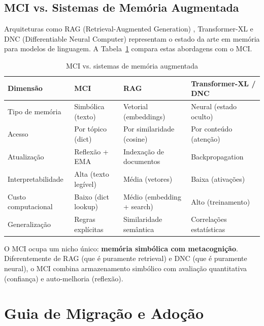 \subsection{MCI vs. Sistemas de Memória Augmentada}

Arquiteturas como RAG (Retrieval-Augmented Generation) \cite{Lewis2020_RAG}, Transformer-XL \cite{Dai2019_TransformerXL} e DNC (Differentiable Neural Computer) \cite{Rae2016_DNC} representam o estado da arte em memória para modelos de linguagem. A Tabela~\ref{tab:augmented-memory} compara estas abordagens com o MCI.

\begin{table}[htbp]
\centering
\caption{MCI vs. sistemas de memória augmentada}
\label{tab:augmented-memory}
\begin{tabular}{@{}p{2.5cm}p{3.5cm}p{3.5cm}p{3.5cm}@{}}
\toprule
\textbf{Dimensão} & \textbf{MCI} & \textbf{RAG} & \textbf{Transformer-XL / DNC} \\
\midrule
Tipo de memória & Simbólica (texto) & Vetorial (embeddings) & Neural (estado oculto) \\
Acesso & Por tópico (dict) & Por similaridade (cosine) & Por conteúdo (atenção) \\
Atualização & Reflexão + EMA & Indexação de documentos & Backpropagation \\
Interpretabilidade & Alta (texto legível) & Média (vetores) & Baixa (ativações) \\
Custo computacional & Baixo (dict lookup) & Médio (embedding + search) & Alto (treinamento) \\
Generalização & Regras explícitas & Similaridade semântica & Correlações estatísticas \\
\bottomrule
\end{tabular}
\end{table}

O MCI ocupa um nicho único: \textbf{memória simbólica com metacognição}. Diferentemente de RAG (que é puramente retrieval) e DNC (que é puramente neural), o MCI combina armazenamento simbólico com avaliação quantitativa (confiança) e auto-melhoria (reflexão).

\section{Guia de Migração e Adoção}
\label{sec:migration}

